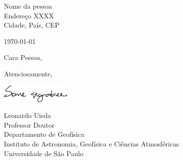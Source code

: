 \documentclass[onecolumn,10pt]{article}
\newcommand{\Nome}{Leonardo Uieda}
\newcommand{\Cargo}{Professor Doutor}
\newcommand{\Padding}{\vspace{0.5cm}}
\begin{document}
\begin{flushleft}
  Nome da pessoa
  \\
  Endereço XXXX
  \\
  Cidade, País, CEP
\end{flushleft}
\begin{flushright}
  \today
\end{flushright}
\Padding

\noindent
Cara Pessoa,
\Padding

\lipsum[1-2]
\Padding

\begin{flushleft}
  Atenciosamente,

  \Padding
  \includegraphics[height=0.9cm]{assinatura.png}

  \Nome{}
  \\[0.25cm]
  {
    \color{mediumgray}
    \small
    \Cargo
    \\
    Departamento de Geofísica
    \\
    Instituto de Astronomia, Geofísica e Ciências Atmosféricas
    \\
    Universidade de São Paulo
  }
\end{flushleft}
\end{document}
